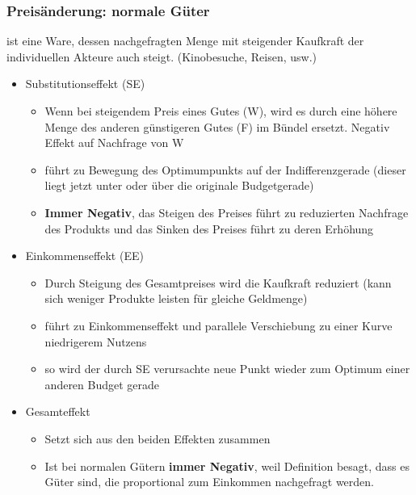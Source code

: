 \subsubsection{Preisänderung: normale Güter}

\begin{definition}
     ist eine Ware, dessen nachgefragten Menge mit steigender Kaufkraft der individuellen Akteure auch steigt. (Kinobesuche, Reisen, usw.)  
\end{definition}

\begin{itemize}
    \item Substitutionseffekt (SE)
    \begin{itemize}
        \item Wenn bei steigendem Preis eines Gutes (W), wird es durch eine höhere Menge des anderen günstigeren Gutes (F) im Bündel ersetzt. Negativ Effekt auf Nachfrage von W
        \item führt zu Bewegung des Optimumpunkts auf der Indifferenzgerade (dieser liegt jetzt unter oder über die originale Budgetgerade)
        \item \textbf{Immer Negativ}, das Steigen des Preises führt zu reduzierten Nachfrage des Produkts und das Sinken des Preises führt zu deren Erhöhung
    \end{itemize}
    \item Einkommenseffekt (EE)
    \begin{itemize}
        \item Durch Steigung des Gesamtpreises wird die Kaufkraft reduziert (kann sich weniger Produkte leisten für gleiche Geldmenge)
        \item führt zu Einkommenseffekt und parallele Verschiebung zu einer Kurve niedrigerem Nutzens
        \item so wird der durch SE verursachte neue Punkt wieder zum Optimum einer anderen Budget gerade
    \end{itemize}
    \item Gesamteffekt
    \begin{itemize}
        \item Setzt sich aus den beiden Effekten zusammen
        \item Ist bei normalen Gütern \textbf{immer Negativ}, weil Definition besagt, dass es Güter sind, die proportional zum Einkommen nachgefragt werden.
    \end{itemize}
\end{itemize}

